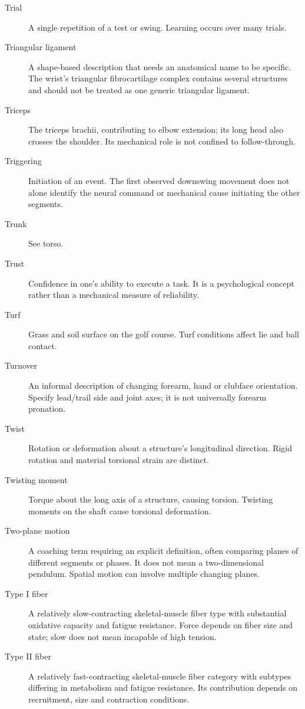 \begin{description}
\item[Trial] A single repetition of a test or swing. Learning occurs over many trials.

\item[Triangular ligament] A shape-based description that needs an anatomical name to be specific. The wrist's triangular fibrocartilage complex contains several structures and should not be treated as one generic triangular ligament.

\item[Triceps] The triceps brachii, contributing to elbow extension; its long head also crosses the shoulder. Its mechanical role is not confined to follow-through.

\item[Triggering] Initiation of an event. The first observed downswing movement does not alone identify the neural command or mechanical cause initiating the other segments.

\item[Trunk] See torso.

\item[Trust] Confidence in one's ability to execute a task. It is a psychological concept rather than a mechanical measure of reliability.

\item[Turf] Grass and soil surface on the golf course. Turf conditions affect lie and ball contact.

\item[Turnover] An informal description of changing forearm, hand or clubface orientation. Specify lead/trail side and joint axes; it is not universally forearm pronation.

\item[Twist] Rotation or deformation about a structure's longitudinal direction. Rigid rotation and material torsional strain are distinct.

\item[Twisting moment] Torque about the long axis of a structure, causing torsion. Twisting moments on the shaft cause torsional deformation.

\item[Two-plane motion] A coaching term requiring an explicit definition, often comparing planes of different segments or phases. It does not mean a two-dimensional pendulum. Spatial motion can involve multiple changing planes.

\item[Type I fiber] A relatively slow-contracting skeletal-muscle fiber type with substantial oxidative capacity and fatigue resistance. Force depends on fiber size and state; slow does not mean incapable of high tension.

\item[Type II fiber] A relatively fast-contracting skeletal-muscle fiber category with subtypes differing in metabolism and fatigue resistance. Its contribution depends on recruitment, size and contraction conditions.

\end{description}

